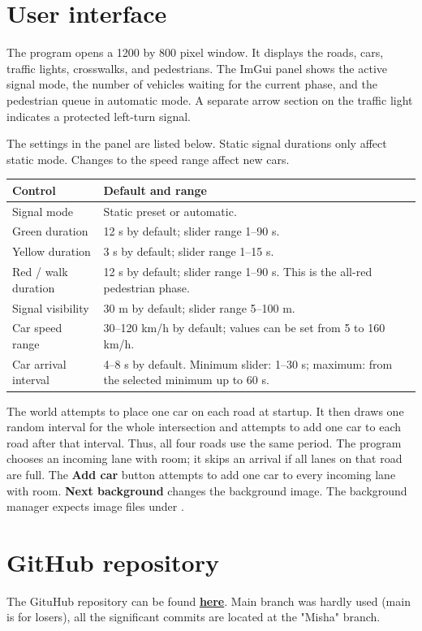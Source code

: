 \documentclass[12pt,a4paper]{article}
\newcommand{\code}[1]{\textbf{\detokenize{#1}}}
\begin{document}
	\section{User interface}
	
	The program opens a 1200 by 800 pixel window. It displays the roads, cars,
	traffic lights, crosswalks, and pedestrians. The ImGui panel shows the active
	signal mode, the number of vehicles waiting for the current phase, and the
	pedestrian queue in automatic mode. A separate arrow section on the traffic
	light indicates a protected left-turn signal.
	
	The settings in the panel are listed below. Static signal durations only affect
	static mode. Changes to the speed range affect new cars.
	
	\begin{center}
		\begin{tabularx}{\linewidth}{@{}p{3.3cm}X@{}}
			\toprule
			\textbf{Control} & \textbf{Default and range} \\
			\midrule
			Signal mode & Static preset or automatic. \\
			Green duration & 12 s by default; slider range 1--90 s. \\
			Yellow duration & 3 s by default; slider range 1--15 s. \\
			Red / walk duration & 12 s by default; slider range 1--90 s. This is the
			all-red pedestrian phase. \\
			Signal visibility & 30 m by default; slider range 5--100 m. \\
			Car speed range & 30--120 km/h by default; values can be set from 5 to
			160 km/h. \\
			Car arrival interval & 4--8 s by default. Minimum slider: 1--30 s; maximum:
			from the selected minimum up to 60 s. \\
			\bottomrule
		\end{tabularx}
	\end{center}
	
	The world attempts to place one car on each road at startup. It then draws one
	random interval for the whole intersection and attempts to add one car to each
	road after that interval. Thus, all four roads use the same period. The program
	chooses an incoming lane with room; it skips an arrival if all lanes on that
	road are full. The \textbf{Add car} button attempts to add one car to every
	incoming lane with room. \textbf{Next background} changes the background image.
	The background manager expects image files under \code{../assets/}.
	
	\section{GitHub repository}
	
	The GituHub repository can be found \textbf{\href{https://github.com/WawandMG/Drunken-driver-simulator/tree/misha}{here}}. Main branch was hardly used (main is for losers), all the significant commits are located at the "Misha" branch.
\end{document}
